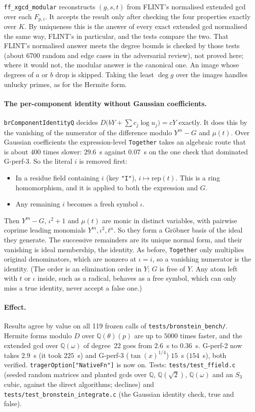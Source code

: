\documentclass[11pt]{article}
\theoremstyle{definition}
\theoremstyle{remark}
\newcommand{\Q}{\mathbb{Q}}
\newcommand{\code}[1]{\texttt{#1}}
\begin{document}
\noindent \code{ff\_xgcd\_modular} reconstructs $(g,s,t)$ from FLINT's normalised
extended gcd over each $F_{p,i}$. It accepts the result only after checking the
four properties exactly over $K$. By uniqueness this is the answer of every exact
extended gcd normalised the same way, FLINT's in particular, and the tests compare
the two. That FLINT's normalised answer meets the degree bounds is checked by
those tests (about 6700 random and edge cases in the adversarial review), not
proved here; where it would not, the modular answer is the canonical one. An image whose degrees of $a$ or $b$ drop is skipped. Taking the least
$\deg g$ over the images handles unlucky primes, as for the Hermite form.

\paragraph{The per-component identity without Gaussian coefficients.}
\code{brComponentIdentityQ} decides
$D\bigl(bY+\sum c_j\log u_j\bigr)=cY$ exactly. It does this by the vanishing of the
numerator of the difference modulo $Y^m-G$ and $\mu(t)$. Over Gaussian coefficients
the expression-level \code{Together} takes an algebraic route that is about $400$
times slower: $29.6$~s against $0.07$~s on the one check that dominated G-perf-3.
So the literal $i$ is removed first:
\begin{itemize}
\item In a residue field containing $i$ (key \code{"I"}), $i\mapsto\mathrm{rep}(t)$.
  This is a ring homomorphism, and it is applied to both the expression and $G$.
\item Any remaining $i$ becomes a fresh symbol $\iota$.
\end{itemize}
Then $Y^m-G$, $\iota^2+1$ and $\mu(t)$ are monic in distinct variables, with
pairwise coprime leading monomials $Y^m,\iota^2,t^n$. So they form a Gr\"obner
basis of the ideal they generate. The successive remainders are its unique normal
form, and their vanishing is ideal membership, the identity. As before, \code{Together} only multiplies original denominators, which are
nonzero at $\iota=i$, so a vanishing numerator is the identity. (The order is
an elimination order in $Y$; $G$ is free of $Y$. Any atom left with $t$ or
$\iota$ inside, such as a radical, behaves as a free symbol, which can only miss
a true identity, never accept a false one.)

\paragraph{Effect.} Results agree by value on all 119 frozen calls of
\code{tests/bronstein\_bench/}. Hermite forms modulo $D$ over $\Q(\theta)(p)$ are
up to $5000$ times faster, and the extended gcd over $\Q(\omega)$ of degree~22 goes
from $2.6$~s to $0.36$~s. G-perf-2 now takes $2.9$~s (it took $225$~s) and
G-perf-3 ($\tan(x)^{1/4}$) $15$~s ($154$~s), both verified. \code{tragerOption["NativeFn"]}
is now on. Tests: \code{tests/test\_ffield.c} (seeded random matrices and planted gcds
over $\Q$, $\Q(\sqrt2)$, $\Q(\omega)$ and an $S_3$ cubic, against the direct
algorithms; declines) and \code{tests/test\_bronstein\_integrate.c} (the Gaussian
identity check, true and false).
\end{document}
